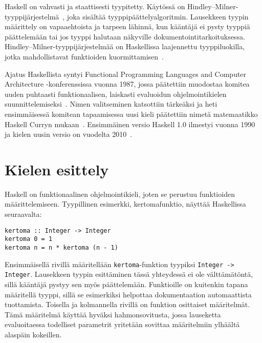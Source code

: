 \documentclass[grading, english, finnish]{tktltiki2}
\theoremstyle{definition}
\theoremstyle{remark}
\begin{document}
Haskell on vahvasti ja staattisesti tyypitetty. Käytössä on Hindley--Milner-tyyppijärjestelmä~\cite[luku~4.1]{Mar10}, joka sisältää tyyppipäättelyalgoritmin. Lausekkeen tyypin määrittely on vapaaehtoista ja tarpeen lähinnä, kun kääntäjä ei pysty tyyppiä päättelemään tai jos tyyppi halutaan näkyville dokumentointitarkoituksessa. Hindley--Milner-tyyppijärjestelmää on Haskellissa laajennettu tyyppiluokilla, jotka mahdollistavat funktioiden kuormittamisen~\cite[luku~4.1]{Mar10}.

Ajatus Haskellista syntyi \foreignlanguage{english}{Functional Programming Languages and Computer Architecture} -konferenssissa vuonna 1987, jossa päätettiin muodostaa komitea uuden puhtaasti funktionaalisen, laiskasti evaluoidun ohjelmointikielen suunnittelemiseksi~\cite[s.~12-1]{Hud07}. Nimen valitseminen katsottiin tärkeäksi ja heti ensimmäisessä komitean tapaamisessa uusi kieli päätettiin nimetä matemaatikko Haskell Curryn mukaan~\cite[s.~12-4]{Hud07}.  Ensimmäinen versio Haskell 1.0 ilmestyi vuonna 1990~\cite{HW90} ja kielen uusin versio on vuodelta 2010~\cite{Mar10}.


\section{Kielen esittely}

Haskell on funktionaalinen ohjelmointikieli, joten se perustuu funktioiden määrittelemiseen. Tyypillinen esimerkki, kertomafunktio, näyttää Haskellissa seuraavalta:
\begin{lstlisting}
kertoma :: Integer -> Integer   
kertoma 0 = 1                 
kertoma n = n * kertoma (n - 1)
\end{lstlisting}
Ensimmäisellä rivillä määritellään \lstinline|kertoma|-funktion tyypiksi \lstinline|Integer -> Integer|. Lausekkeen tyypin esittäminen tässä yhteydessä ei ole välttämätöntä, sillä kääntäjä pystyy sen myös päättelemään. Funktioille on kuitenkin tapana määritellä tyyppi, sillä se esimerkiksi helpottaa dokumentaation automaattista tuottamista. Toisella ja kolmannella rivillä on funktion osittaiset määritelmät. Tämä määritelmä käyttää hyväksi hahmonsovitusta, jossa lauseketta evaluoitaessa todelliset parametrit yritetään sovittaa määritelmiin ylhäältä alaspäin kokeillen.
\end{document}
